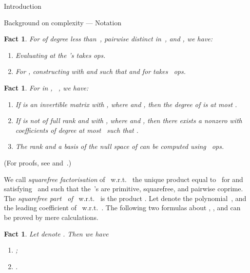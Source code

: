\documentclass{sig-alt-full}
\newtheorem{fact}[lemma]{Fact}
\begin{document}
\begin{section}{Introduction}
\begin{subsection}{Background on complexity --- Notation}
\begin{fact}\label{EvaInter}
For  of degree less than~, pairwise
distinct  in~, and ,
we have:
\vspace{-0.15cm}
\begin{enumerate}
\item[(i)] Evaluating  at the 's takes  ops.
\vspace{-0.2cm}
\item[(ii)] For , constructing
 with  and  such that
 and  for  takes
~ops.
\end{enumerate}
\end{fact}

\begin{fact}\label{le:polymatrix}
For  in , \ , we have:
\vspace{-0.15cm}
\begin{enumerate}
  \item[(i)] If  is an invertible  matrix with ,
where  and , then the degree of  is at most
.
\vspace{-0.2cm}
  \item[(ii)] If  is not of full rank and with , where  and , then there exists a nonzero  with coefficients of degree at most~ such that .
\vspace{-0.2cm}
  \item[(iii)]The rank  and a basis of the null space of  can be computed using
  ~ops.
\end{enumerate}
\end{fact}

\noindent (For proofs, see \cite[Cor.~10.8, 5.18, 11.6]{MCA2003}
and~\cite[Th.~7.3]{Storjohann2005}.)

\smallskip

We call \emph{squarefree factorisation\/} of~
w.r.t.~ the unique product 
equal to~ for  and 
satisfying~ and such that the~'s are primitive,
squarefree, and pairwise coprime. The \emph{squarefree part~
of~\/} w.r.t.~ is the product .
Let  denote the polynomial~, and  the leading
coefficient of~ w.r.t.~.
The following two formulas about , , and  can be proved
by mere calculations.

\begin{fact}\label{prop:deflation}
Let  denote . Then we have
\vspace{-0.15cm}
\begin{enumerate}
 \item[(i)]  ;
\vspace{-0.2cm}
 \item[(ii)] .
\end{enumerate}
\end{fact}


\end{subsection}
\end{section}
\end{document}
